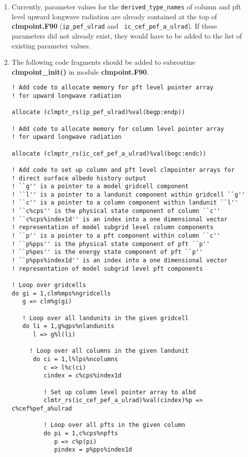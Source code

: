 \begin{enumerate}

\item
Currently, parameter values for the {\tt derived\_type\_names} of
column and pft level upward longwave radiation are already contained
at the top of {\bf clmpoint.F90} ({\tt ip\_pef\_ulrad} and {\tt
ic\_cef\_pef\_a\_ulrad}). If these parameters did not already exist,
they would have to be added to the list of existing parameter values.

\item
The following code fragments should be added to subroutine {\bf
clmpoint\_init()} in module {\bf clmpoint.F90}.
\begin{verbatim}
! Add code to allocate memory for pft level pointer array 
! for upward longwave radiation

allocate (clmptr_rs(ip_pef_ulrad)%val(begp:endp))

! Add code to allocate memory for column level pointer array 
! for upward longwave radiation

allocate (clmptr_rs(ic_cef_pef_a_ulrad)%val(begc:endc)) 

! Add code to set up column and pft level clmpointer arrays for
! direct surface albedo history output
! ``g'' is a pointer to a model gridcell component
! ``l'' is a pointer to a landunit component within gridcell ``g''	
! ``c'' is a pointer to a column component within landunit ``l''	
! ``c%cps'' is the physical state component of column ``c''
! ``c%cps%index1d'' is an index into a one dimensional vector
! representation of model subgrid level column components 
! ``p'' is a pointer to a pft component within column ``c''	
! ``p%pps'' is the physical state component of pft ``p''
! ``p%pes'' is the energy state component of pft ``p''
! ``p%pps%index1d'' is an index into a one dimensional vector
! representation of model subgrid level pft components 

! Loop over gridcells
do gi = 1,clm%mps%ngridcells
   g => clm%g(gi)

   ! Loop over all landunits in the given gridcell
   do li = 1,g%gps%nlandunits
      l => g%l(li)

     ! Loop over all columns in the given landunit
      do ci = 1,l%lps%ncolumns
         c => l%c(ci)
         cindex = c%cps%index1d

         ! Set up column level pointer array to albd
         clmtr_rs(ic_cef_pef_a_ulrad)%val(cindex)%p => c%cef%pef_a%ulrad

         ! Loop over all pfts in the given column
         do pi = 1,c%cps%npfts
            p => c%p(pi)
            pindex = p%pps%index1d


\end{verbatim}
\end{enumerate}
